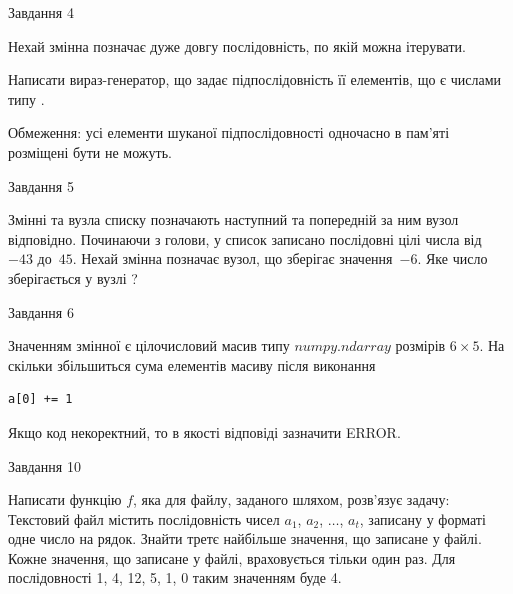 \documentclass[12pt, ukrainian]{article}
\begin{document}
{               
{\begin{center}Завдання {4}\end{center}}
\vspace{-6mm}
Нехай змінна  позначає дуже довгу послідовність, по якій можна ітерувати.

Написати вираз-генератор, що задає підпослідовність її елементів, що є числами типу .

Обмеження: усі елементи шуканої підпослідовності одночасно в пам'яті розміщені бути не можуть.\par

\vspace{10mm}
               
{\begin{center}Завдання {5}\end{center}}
\vspace{-6mm}
Змінні  та  вузла списку позначають наступний та попередній за ним вузол відповідно. Починаючи з голови, у список записано послідовні цілі числа від~$-43$ до~$45$. Нехай змінна  позначає вузол, що зберігає значення~$-6$.
Яке число зберігається у вузлі  ?\par

               
{\begin{center}Завдання {6}\end{center}}
\vspace{-6mm}
Значенням змінної  є цілочисловий масив типу $numpy.ndarray$ розмірів $6{\times}5$. На скільки збільшиться сума елементів масиву  після виконання
\begin{verbatim}
a[0] += 1
\end{verbatim}


Якщо код некоректний, то в якості відповіді зазначити ERROR.\par

               
{\begin{center}Завдання {10}\end{center}}
\vspace{-6mm}

Написати функцію $f$, яка для файлу, заданого шляхом, розв’язує задачу:\\ Текстовий файл містить послідовність чисел $a_1$, $a_2$, $\ldots$, $a_t$, записану у форматі одне число на рядок. Знайти третє найбільше значення, що записане у файлі. Кожне значення, що записане у файлі, враховується тільки один раз. Для послідовності 1, 4, 12, 5, 1, 0 таким значенням буде 4.

}
\end{document}
